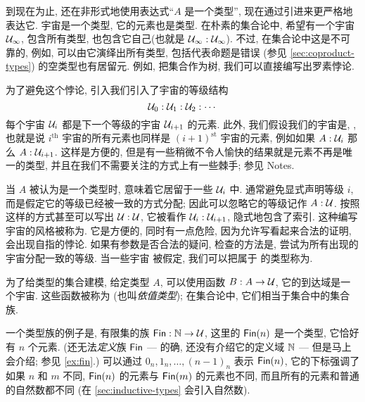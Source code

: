 到现在为止, 还在非形式地使用表达式``$A$ 是一个类型'', 现在通过引进来更严格地表达它.
%
%
宇宙是一个类型, 它的元素也是类型.
在朴素的集合论中, 希望有一个宇宙 $\mathcal{U}_\infty$, 包含所有类型, 也包含它自己(也就是 $\mathcal{U}_\infty : \mathcal{U}_\infty$).
不过, 在集合论中这是不可靠的, 例如, 可以由它演绎出所有类型, 包括代表命题是错误 (参见 \cref{sec:coproduct-types}) 的空类型也有居留元.
例如, 把集合作为树, 我们可以直接编写出罗素悖论\cite{coquand:paradox}.

为了避免这个悖论, 引入我们引入了宇宙的等级结构
\[ \mathcal{U}_0 : \mathcal{U}_1 : \mathcal{U}_2 : \cdots \]
每个宇宙 $\mathcal{U}_i$ 都是下一个等级的宇宙 $\mathcal{U}_{i+1}$ 的元素.
此外, 我们假设我们的宇宙是,  , 也就是说 $i^{\mathrm{th}}$ 宇宙的所有元素也同样是 $(i+1)^{\mathrm{st}}$ 宇宙的元素, 例如如果 $A:\mathcal{U}_i$ 那么 $A:\mathcal{U}_{i+1}$.
这样是方便的, 但是有一些稍微不令人愉快的结果就是元素不再是唯一的类型, 并且在我们不需要关注的方式上有一些棘手;
参见 Notes.

当 $A$ 被认为是一个类型时, 意味着它居留于一些 $\mathcal{U}_i$ 中.
通常避免显式声明等级
%
%
%
$i$, 而是假定它的等级已经被一致的方式分配;
因此可以忽略它的等级记作 $A:\mathcal{U}$.
按照这样的方式甚至可以写出 $\mathcal{U}:\mathcal{U}$, 它被看作 $\mathcal{U}_i:\mathcal{U}_{i+1}$, 隐式地包含了索引.
这种编写宇宙的风格被称为.
它是方便的, 同时有一点危险, 因为允许写看起来合法的证明, 会出现自指的悖论.
如果有参数是否合法的疑问, 检查的方法是, 尝试为所有出现的宇宙分配一致的等级.
当一些宇宙 \UU 被假定, 我们可以把属于 \UU 的类型称为.
%
%


为了给类型的集合建模, 给定类型 $A$, 可以使用函数 $B : A \to \mathcal{U}$, 它的到达域是一个宇宙.
这些函数被称为
%
(也叫\emph{依值类型});
%
%
%
%
在集合论中, 它们相当于集合中的集合族.


一个类型族的例子是, 有限集的族 $\mathsf{Fin} : \mathbb{N} \to \mathcal{U}$, 这里的 $\mathsf{Fin}(n)$ 是一个类型, 它恰好有 $n$ 个元素.
(还无法\emph{定义}族 $\mathsf{Fin}$ --- 的确, 还没有介绍它的定义域 $\mathbb{N}$ --- 但是马上会介绍; 参见 \cref{ex:fin}.)
可以通过 $0_n,1_n,\dots,(n-1)_n$ 表示 $\mathsf{Fin}(n)$, 它的下标强调了如果 $n$ 和 $m$ 不同,  $\mathsf{Fin}(n)$ 的元素与 $\mathsf{Fin}(m)$ 的元素也不同, 而且所有的元素和普通的自然数都不同 (在 \cref{sec:inductive-types} 会引入自然数).
%


